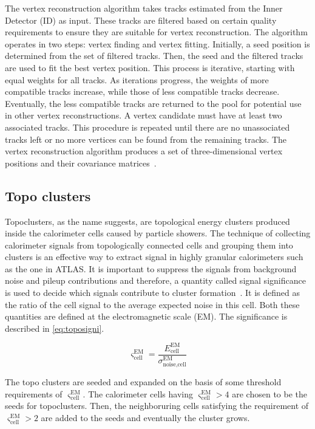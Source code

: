 The vertex reconstruction algorithm takes tracks estimated from the Inner Detector (ID) as input. These tracks are filtered based on certain quality requirements to ensure 
they are suitable for vertex reconstruction. The algorithm operates in two steps: vertex finding and vertex fitting. Initially, a seed position is determined from the set of 
filtered tracks. Then, the seed and the filtered tracks are used to fit the best vertex position. This process is iterative, starting with equal weights for all tracks. As iterations 
progress, the weights of more compatible tracks increase, while those of less compatible tracks decrease. Eventually, the less compatible tracks are returned to the pool for potential 
use in other vertex reconstructions. A vertex candidate must have at least two associated tracks. This procedure is repeated until there are no unassociated tracks left or no more 
vertices can be found from the remaining tracks. The vertex reconstruction algorithm produces a set of three-dimensional vertex positions and their covariance 
matrices~\cite{F_Meloni_vertex}.


\subsection{Topo clusters}
Topoclusters, as the name suggests, are topological energy clusters produced inside the calorimeter cells caused by particle showers. 
The technique of collecting calorimeter signals from topologically connected cells and grouping them into clusters is an effective way to extract signal in 
highly granular calorimeters such as the one in ATLAS. It is important to suppress the signals from background noise and pileup contributions and therefore, 
a quantity called signal significance is used to decide which signals contribute to cluster formation~\cite{Aad:2138166}. It is defined as the ratio of the cell signal to the average 
expected noise in this cell. Both these quantities are defined at the electromagnetic scale (EM). The significance is described in \cref{eq:toposigni}.

\begin{equation}
    \varsigma_{\text{cell}}^{\text{EM}} = \frac{E_{\text{cell}}^{\text{EM}}}{\sigma_{\text{noise,cell}}^{\text{EM}}}
    \label{eq:toposigni}
\end{equation}

The topo clusters are seeded and expanded on the basis of some threshold requirements of $\varsigma_{\text{cell}}^{\text{EM}}$. 
The calorimeter cells having $\varsigma_{\text{cell}}^{\text{EM}}>4$ are chosen to be the seeds for topoclusters. Then, the 
neighboruring cells satisfying the requirement of $\varsigma_{\text{cell}}^{\text{EM}}>2$ are added to the seeds and eventually the
cluster grows.


